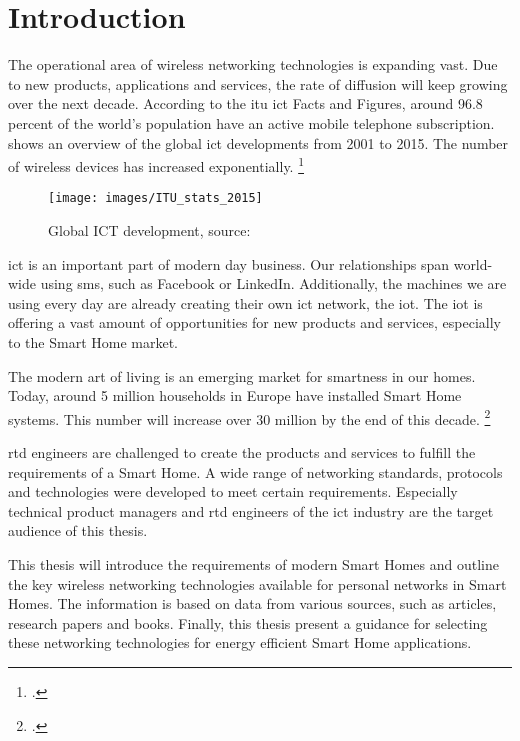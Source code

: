 \chapter{Introduction}
\label{ch:intro}

The operational area of wireless networking technologies is expanding vast. Due to new products, applications and services, the rate of diffusion will keep growing over the next decade. According to the \gls{itu} \gls{ict} Facts and Figures, around 96.8 percent of the world's population have an active mobile telephone subscription.  shows an overview of the global \gls{ict} developments from 2001 to 2015. The number of wireless devices has increased exponentially. \footcite[Cf.][]{ictstats2015}

\begin{figure}[ht]
  \centering
  \texttt{[image: images/ITU\_stats\_2015]}
  \caption{Global ICT development, source: \cite{ictstats2015}}
  \label{fig:global-ict-development}
\end{figure}

\gls{ict} is an important part of modern day business. Our relationships span world-wide using \gls{sms}, such as Facebook or LinkedIn. Additionally, the machines we are using every day are already creating their own \gls{ict} network, the \gls{iot}. The \gls{iot} is offering a vast amount of opportunities for new products and services, especially to the Smart Home market.

The modern art of living is an emerging market for smartness in our homes. Today, around 5 million households in Europe have installed Smart Home systems. This number will increase over 30 million by the end of this decade. \footcite[Cf.][]{berg2015}

\gls{rtd} engineers are challenged to create the products and services to fulfill the requirements of a Smart Home. A wide range of networking standards, protocols and technologies were developed to meet certain requirements. Especially technical product managers and \gls{rtd} engineers of the \gls{ict} industry are the target audience of this thesis.

This thesis will introduce the requirements of modern Smart Homes and outline the key wireless networking technologies available for personal networks in Smart Homes. The information is based on data from various sources, such as articles, research papers and books. Finally, this thesis present a guidance for selecting these networking technologies for energy efficient Smart Home applications.

